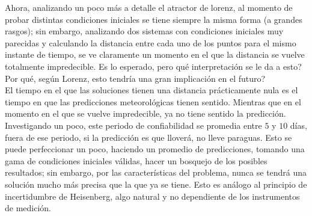 Ahora, analizando un poco más a detalle el atractor de lorenz, al momento de probar distintas condiciones iniciales se tiene siempre la misma forma (a grandes rasgos); sin embargo, analizando dos sistemas con condiciones iniciales muy parecidas y  calculando la distancia entre cada uno de los puntos para el mismo instante de tiempo, se ve claramente un momento en el que la distancia se vuelve totalmente impredecible. Es lo esperado, pero qué interpretación se le da a esto? Por qué, según Lorenz, esto tendría una gran implicación en el futuro? \\

El tiempo en el que las soluciones tienen una distancia prácticamente nula es el tiempo en que las predicciones meteorológicas tienen sentido. Mientras que en el momento en el que se vuelve impredecible, ya no tiene sentido la predicción. Investigando un poco, este periodo de confiabilidad se promedia entre $5$ y $10$ días, fuera de ese periodo, si la predicción es que lloverá, no lleve paraguas. Esto se puede perfeccionar un poco, haciendo un promedio de predicciones, tomando una gama de condiciones iniciales válidas, hacer un bosquejo de los posibles resultados; sin embargo, por las características del problema, nunca se tendrá una solución mucho más precisa que la que ya se tiene. Esto es análogo al principio de incertidumbre de Heisenberg, algo natural y no dependiente de los instrumentos de medición.

















